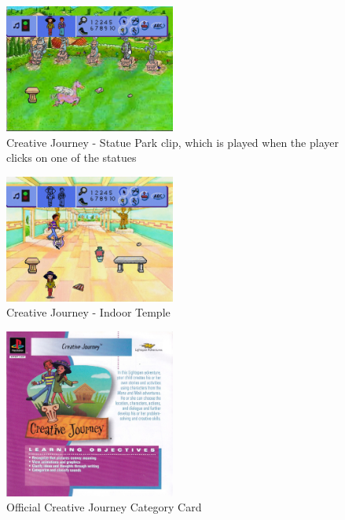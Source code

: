 \begin{figure}[H]
    \centering
    \includegraphics[width=0.5\textwidth]{"./Games/Creative/Images/CreativeJourneyScreenshot2.jpg"}
    \caption{Creative Journey - Statue Park clip, which is played when the player clicks on one of the statues}
\end{figure}

\begin{figure}[H]
    \centering
    \includegraphics[width=0.5\textwidth]{"./Games/Creative/Images/CreativeJourneyScreenshot3.jpg"}
    \caption{Creative Journey - Indoor Temple}
\end{figure}

\begin{figure}[H]
    \centering
    \includegraphics[width=0.5\textwidth]{"./Games/Creative/Images/CreativeJourneyCDCover.jpg"}
    \caption{Official Creative Journey Category Card}
\end{figure}